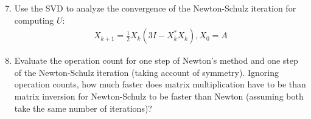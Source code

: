\documentclass{article}
\begin{document}
\begin{enumerate}
	\setcounter{enumi}{6}
	\item Use the SVD to analyze the convergence of the
	Newton\nobreakdash-Schulz iteration for computing $U$:
	\begin{align*}
		X_{k+1} = \frac{1}{2}X_k(3I - X_k^* X_k), X_0 = A
	\end{align*}
\end{enumerate}



\begin{enumerate}
	\setcounter{enumi}{7}
	\item Evaluate the operation count for one step of Newton's 
	method and one step of the Newton\nobreakdash-Schulz iteration (taking
	account of symmetry). Ignoring operation counts, how much faster
	does matrix multiplication have to be than matrix inversion for
	Newton\nobreakdash-Schulz to be faster than Newton (assuming both take the same number of iterations)?
\end{enumerate}

%
%
\end{document}
